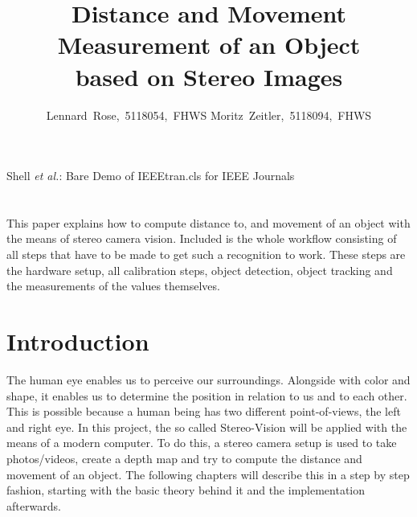 \documentclass[journal,onecolumn]{IEEEtran}
\makeatletter
\renewenvironment{abstract}{%
    \if@twocolumn
      \section*{\abstractname}%
    \else %
      \begin{center}%
        {\bfseries \Large\abstractname\vspace{\z@}}%
      \end{center}%
      \quotation
    \fi}
    {\if@twocolumn\else\endquotation\fi}
\makeatother
\begin{document}
	\title{Distance and Movement Measurement of an Object\\ based on Stereo Images}

	\author{Lennard~Rose,~5118054,~FHWS
		Moritz~Zeitler,~5118094,~FHWS%
	}
	{Shell \MakeLowercase{\textit{et al.}}: Bare Demo of IEEEtran.cls for IEEE Journals}

	\maketitle

	\begin{abstract}
   		\normalsize
		\noindent
		This paper explains how to compute distance to, and movement of an object with the means of stereo camera vision.
		Included is the whole workflow consisting of all steps that have to be made to get such a recognition to work. These steps are the hardware setup, all calibration steps, object detection, object tracking and the measurements of the values themselves.
	\end{abstract}


	\IEEEpeerreviewmaketitle

	\section{Introduction}
\label{sec:einfuehrung}
\noindent
The human eye enables us to perceive our surroundings. Alongside with color and shape, it enables us to determine the position in relation to us and to each other. This is possible because a human being has two different point-of-views, the left and right eye. In this project, the so called Stereo-Vision will be applied with the means of a modern computer. To do this, a stereo camera setup is used to take photos/videos, create a depth map and try to compute the distance and movement of an object. The following chapters will describe this in a step by step fashion, starting with the basic theory behind it and the implementation afterwards.
\end{document}
